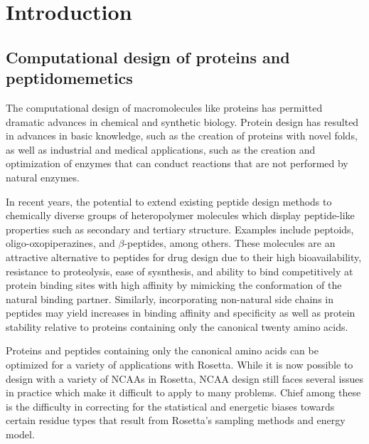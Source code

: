 \section{Introduction}
\subsection{Computational design of proteins and peptidomemetics}
The computational design of macromolecules like proteins has permitted dramatic advances in chemical and synthetic biology.
Protein design has resulted in advances in basic knowledge, such as the creation of proteins with novel folds\cite{kuhlman_design_2003}, as well as industrial and medical applications, such as the creation and optimization of enzymes that can conduct reactions that are not performed by natural enzymes\cite{jiang_denovo_2008,rothlisberger_kemp_2008}.

In recent years, the potential to extend existing peptide design methods to chemically diverse groups of heteropolymer molecules which display peptide-like properties such as secondary and tertiary structure.
Examples include peptoids\cite{renfrew_incorporation_2012}, oligo-oxopiperazines\cite{lao_rational_2014}, and $\beta$-peptides\cite{molski_remodeling_2012}, among others.
These molecules are an attractive alternative to peptides for drug design due to their high bioavailability, resistance to proteolysis, ease of sysnthesis, and ability to bind competitively at protein binding sites with high affinity by mimicking the conformation of the natural binding partner\cite{lao_rational_2014}.
Similarly, incorporating non-natural side chains in peptides may yield increases in binding affinity and specificity as well as protein stability relative to proteins containing only the canonical twenty amino acids\cite{horng_values_2003}.

Proteins and peptides containing only the canonical amino acids can be optimized for a variety of applications with Rosetta\cite{leaver-fay_chapter_2011,jiang_denovo_2008,rothlisberger_kemp_2008,raveh_schueler-furman_2011}.
While it is now possible to design with a variety of NCAAs in Rosetta\cite{renfrew_incorporation_2012,drew_adding_2013}, NCAA design still faces several issues in practice which make it difficult to apply to many problems.
Chief among these is the difficulty in correcting for the statistical and energetic biases towards certain residue types that result from Rosetta's sampling methods and energy model.

